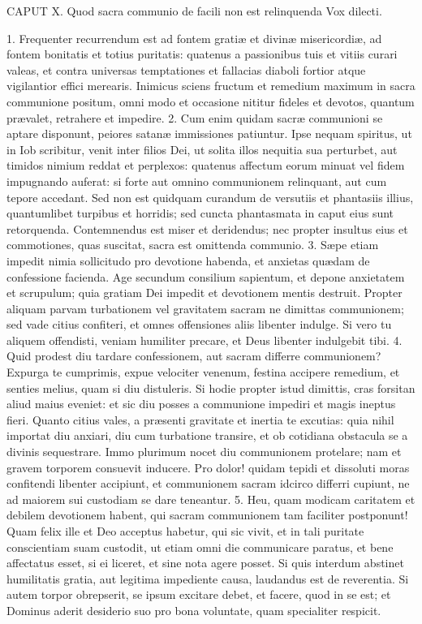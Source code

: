 \documentclass[twoside]{article}
\begin{document}
CAPUT X.
Quod sacra communio de facili non est relinquenda
Vox dilecti.

1. Frequenter recurrendum est ad fontem gratiæ et divinæ misericordiæ, ad fontem bonitatis et totius puritatis: quatenus a passionibus tuis et vitiis curari valeas, et contra universas temptationes et fallacias diaboli fortior atque vigilantior effici merearis. Inimicus sciens fructum et remedium maximum in sacra communione positum, omni modo et occasione nititur fideles et devotos, quantum prævalet, retrahere et impedire.
2. Cum enim quidam sacræ communioni se aptare disponunt, peiores satanæ immissiones patiuntur. Ipse nequam spiritus, ut in Iob scribitur, venit inter filios Dei, ut solita illos nequitia sua perturbet, aut timidos nimium reddat et perplexos: quatenus affectum eorum minuat vel fidem impugnando auferat: si forte aut omnino communionem relinquant, aut cum tepore accedant. Sed non est quidquam curandum de versutiis et phantasiis illius, quantumlibet turpibus et horridis; sed cuncta phantasmata in caput eius sunt retorquenda. Contemnendus est miser et deridendus; nec propter insultus eius et commotiones, quas suscitat, sacra est omittenda communio.
3. Sæpe etiam impedit nimia sollicitudo pro devotione habenda, et anxietas quædam de confessione facienda. Age secundum consilium sapientum, et depone anxietatem et scrupulum; quia gratiam Dei impedit et devotionem mentis destruit. Propter aliquam parvam turbationem vel gravitatem sacram ne dimittas communionem; sed vade citius confiteri, et omnes offensiones aliis libenter indulge. Si vero tu aliquem offendisti, veniam humiliter precare, et Deus libenter indulgebit tibi.
4. Quid prodest diu tardare confessionem, aut sacram differre communionem? Expurga te cumprimis, expue velociter venenum, festina accipere remedium, et senties melius, quam si diu distuleris. Si hodie propter istud dimittis, cras forsitan aliud maius eveniet: et sic diu posses a communione impediri et magis ineptus fieri. Quanto citius vales, a præsenti gravitate et inertia te excutias: quia nihil importat diu anxiari, diu cum turbatione transire, et ob cotidiana obstacula se a divinis sequestrare. Immo plurimum nocet diu communionem protelare; nam et gravem torporem consuevit inducere. Pro dolor! quidam tepidi et dissoluti moras confitendi libenter accipiunt, et communionem sacram idcirco differri cupiunt, ne ad maiorem sui custodiam se dare teneantur.
5. Heu, quam modicam caritatem et debilem devotionem habent, qui sacram communionem tam faciliter postponunt! Quam felix ille et Deo acceptus habetur, qui sic vivit, et in tali puritate conscientiam suam custodit, ut etiam omni die communicare paratus, et bene affectatus esset, si ei liceret, et sine nota agere posset. Si quis interdum abstinet humilitatis gratia, aut legitima impediente causa, laudandus est de reverentia. Si autem torpor obrepserit, se ipsum excitare debet, et facere, quod in se est; et Dominus aderit desiderio suo pro bona voluntate, quam specialiter respicit.
\end{document}
